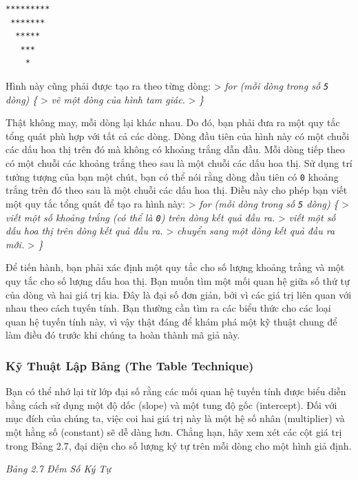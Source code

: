 \begin{verbatim}
********* 
 ******* 
  ***** 
   *** 
    *
\end{verbatim}

Hình này cũng phải được tạo ra theo từng dòng: \textgreater{} \emph{for
(mỗi dòng trong số \texttt{5} dòng) \{} \textgreater{} \emph{vẽ một dòng
của hình tam giác.} \textgreater{} \emph{\}}

Thật không may, mỗi dòng lại khác nhau. Do đó, bạn phải đưa ra một quy
tắc tổng quát phù hợp với tất cả các dòng. Dòng đầu tiên của hình này có
một chuỗi các dấu hoa thị trên đó mà không có khoảng trắng dẫn đầu. Mỗi
dòng tiếp theo có một chuỗi các khoảng trắng theo sau là một chuỗi các
dấu hoa thị. Sử dụng trí tưởng tượng của bạn một chút, bạn có thể nói
rằng dòng đầu tiên có \texttt{0} khoảng trắng trên đó theo sau là một
chuỗi các dấu hoa thị. Điều này cho phép bạn viết một quy tắc tổng quát
để tạo ra hình này: \textgreater{} \emph{for (mỗi dòng trong số
\texttt{5} dòng) \{} \textgreater{} \emph{viết một số khoảng trắng (có
thể là \texttt{0}) trên dòng kết quả đầu ra.} \textgreater{} \emph{viết
một số dấu hoa thị trên dòng kết quả đầu ra.} \textgreater{}
\emph{chuyển sang một dòng kết quả đầu ra mới.} \textgreater{} \emph{\}}

Để tiến hành, bạn phải xác định một quy tắc cho số lượng khoảng trắng và
một quy tắc cho số lượng dấu hoa thị. Bạn muốn tìm một mối quan hệ giữa
số thứ tự của dòng và hai giá trị kia. Đây là đại số đơn giản, bởi vì
các giá trị liên quan với nhau theo cách tuyến tính. Bạn thường cần tìm
ra các biểu thức cho các loại quan hệ tuyến tính này, vì vậy thật đáng
để khám phá một kỹ thuật chung để làm điều đó trước khi chúng ta hoàn
thành mã giả này.

\subsubsection{Kỹ Thuật Lập Bảng (The Table
Technique)}\label{kux1ef9-thuux1eadt-lux1eadp-bux1ea3ng-the-table-technique}

Bạn có thể nhớ lại từ lớp đại số rằng các mối quan hệ tuyến tính được
biểu diễn bằng cách sử dụng một độ dốc (slope) và một tung độ gốc
(intercept). Đối với mục đích của chúng ta, việc coi hai giá trị này là
một hệ số nhân (multiplier) và một hằng số (constant) sẽ dễ dàng hơn.
Chẳng hạn, hãy xem xét các cột giá trị trong Bảng 2.7, đại diện cho số
lượng ký tự trên mỗi dòng cho một hình giả định.

\emph{Bảng 2.7 Đếm Số Ký Tự}

